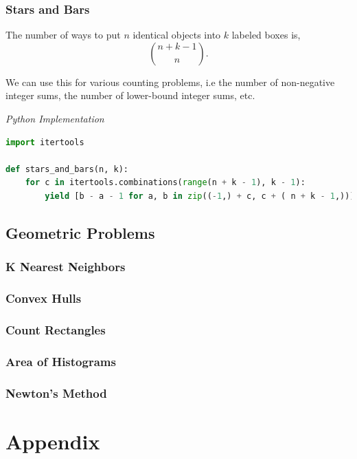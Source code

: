 \documentclass{article}
\begin{document}
    \subsubsection{Stars and Bars}

    The number of ways to put $n$ identical objects into $k$ labeled boxes is,
    \[
    \binom{n+k-1}{n}.
    \]
    
    We can use this for various counting problems, i.e the number of non-negative integer sums, the number of lower-bound integer sums, etc.

\vspace{8pt} \emph{Python Implementation}
\begin{lstlisting}[language=Python]
import itertools

def stars_and_bars(n, k):
    for c in itertools.combinations(range(n + k - 1), k - 1):
        yield [b - a - 1 for a, b in zip((-1,) + c, c + ( n + k - 1,))]
\end{lstlisting}


\subsection{Geometric Problems}
    \subsubsection{K Nearest Neighbors}
    \subsubsection{Convex Hulls}
    \subsubsection{Count Rectangles}
    \subsubsection{Area of Histograms}
    \subsubsection{Newton's Method}
\newpage
\section{Appendix}
\end{document}
